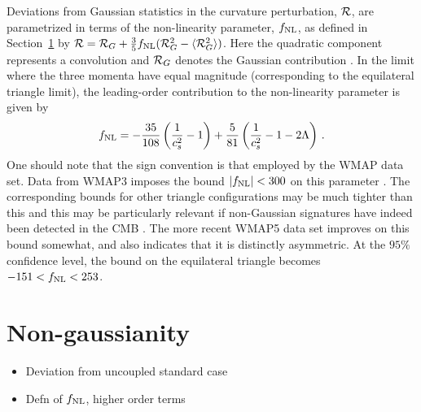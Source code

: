 Deviations from Gaussian statistics in the curvature perturbation, ${\cal{R}}$,
are parametrized in terms of the non-linearity parameter, 
$f_{\mathrm{NL}}$, as defined in Section~\ref{sec:fnl-intro} by 
${\cal{R}} = {\cal{R}}_G + \frac{3}{5} f_{\mathrm{NL}}  (
{\cal{R}}_G^2 -\langle {\cal{R}}_G^2 \rangle )$. Here the 
quadratic component represents a convolution and 
${\cal{R}}_G$ denotes the Gaussian contribution \cite{maldacena}\footnotemark.
 In the limit  
where the three momenta have equal magnitude (corresponding to the equilateral  
triangle limit), the leading-order contribution to the non-linearity 
parameter is given by \cite{chenetal,lidser3}
% 
\begin{equation} 
\label{eq:fnldefn-dbiintro}
 f_{\mathrm{NL}} = -\frac{35}{108}\left(\frac{1}{c_s^2} -1 \right) +
\frac{5}{81}\left( \frac{1}{c_s^2} -1 -2\Lambda \right) \,.
\end{equation}
%  
One should note that the sign convention is that employed
by the WMAP data set.
Data from WMAP3 imposes the bound $|f_{\mathrm{NL}}| < 300$ on this parameter
\cite{spergel}. The corresponding bounds for other triangle configurations 
may be much tighter than this and this may be particularly relevant if 
non-Gaussian signatures have indeed been detected in the 
CMB \cite{Yadav:2007yy,crim}. The more recent WMAP5 data set
\cite{Komatsu:2008hk} improves on this bound somewhat, and
also indicates that it is distinctly asymmetric. At the $95 \%$ confidence
level, the bound on the 
equilateral triangle becomes $-151 < f_{\mathrm{NL}} < 253$.


\section{Non-gaussianity}
\label{sec:fnl-intro}
\begin{itemize}
 \item Deviation from uncoupled standard case
 \item Defn of $f_{\mathrm{NL}}$, higher order terms
\end{itemize}


